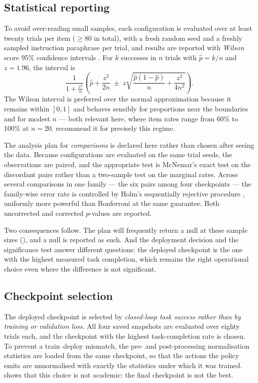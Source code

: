 \subsection{Statistical reporting}
\label{sec:m-stats}
To avoid over-reading small samples, each configuration is evaluated over at least
twenty trials per item ($\ge 80$ in total), with a fresh random seed and a freshly
sampled instruction paraphrase per trial, and results are reported with
\emph{Wilson} score 95\% confidence intervals \parencite{wilson1927ci}. For $k$
successes in $n$ trials with $\hat{p}=k/n$ and $z=1.96$, the interval is
\begin{equation}
\frac{1}{1+\frac{z^2}{n}}
\left(
\hat{p}+\frac{z^2}{2n}
\;\pm\;
z\sqrt{\frac{\hat{p}(1-\hat{p})}{n}+\frac{z^2}{4n^2}}
\right).
\label{eq:wilson}
\end{equation}
The Wilson interval is preferred over the normal approximation because it remains
within $[0,1]$ and behaves sensibly for proportions near the boundaries and for
modest $n$ --- both relevant here, where item rates range from 60\% to 100\% at
$n=20$. \textcite{brown2001binomial} recommend it for precisely this regime.

The analysis plan for \emph{comparisons} is declared here rather than chosen after
seeing the data. Because configurations are evaluated on the same trial seeds, the
observations are paired, and the appropriate test is McNemar's exact test on the
discordant pairs \parencite{mcnemar1947test} rather than a two-sample test on the
marginal rates. Across several comparisons in one family --- the six pairs among four
checkpoints --- the family-wise error rate is controlled by Holm's sequentially
rejective procedure \parencite{holm1979correction}, uniformly more powerful than
Bonferroni at the same guarantee. Both uncorrected and corrected $p$-values are
reported.

Two consequences follow. The plan will frequently return a null at these sample sizes
(), and a null is reported as such. And the deployment decision and
the significance test answer different questions: the deployed checkpoint is the one
with the highest measured task completion, which remains the right operational choice
even where the difference is not significant.

\subsection{Checkpoint selection}
\label{sec:m-checkpoint}
The deployed checkpoint is selected by \emph{closed-loop task success rather than
by training or validation loss}. All four saved snapshots are evaluated over eighty
trials each, and the checkpoint with the highest task-completion rate is chosen. To
prevent a train--deploy mismatch, the pre- and post-processing normalisation
statistics are loaded from the same checkpoint, so that the actions the policy
emits are unnormalised with exactly the statistics under which it was trained.
 shows that this choice is not academic: the final
checkpoint is not the best.

